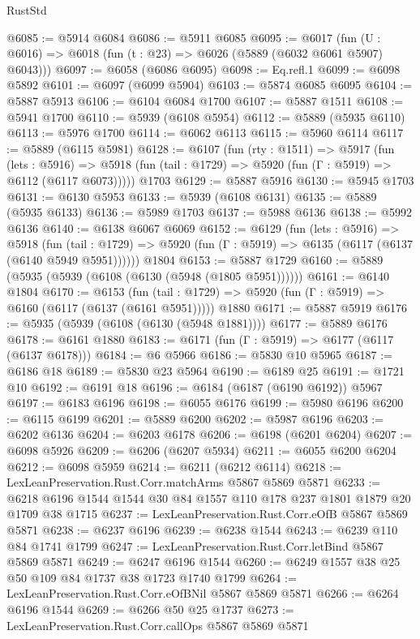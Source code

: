 \begin{lexlean}{RustStd}
\begin{coremodule}
@6085 := @5914 @6084
@6086 := @5911 @6085
@6095 := @6017 (fun (U : @6016) => @6018 (fun (t : @23) => @6026 (@5889 (@6032 @6061 @5907) @6043)))
@6097 := @6058 (@6086 @6095)
@6098 := Eq.refl.{1}
@6099 := @6098 @5892
@6101 := @6097 (@6099 @5904)
@6103 := @5874 @6085 @6095
@6104 := @5887 @5913
@6106 := @6104 @6084 @1700
@6107 := @5887 @1511
@6108 := @5941 @1700
@6110 := @5939 (@6108 @5954)
@6112 := @5889 (@5935 @6110)
@6113 := @5976 @1700
@6114 := @6062 @6113
@6115 := @5960 @6114
@6117 := @5889 (@6115 @5981)
@6128 := @6107
    (fun (rty : @1511) =>
    @5917
      (fun (lets : @5916) =>
      @5918 (fun (tail : @1729) => @5920 (fun (Γ : @5919) => @6112 (@6117 @6073)))))
    @1703
@6129 := @5887 @5916
@6130 := @5945 @1703
@6131 := @6130 @5953
@6133 := @5939 (@6108 @6131)
@6135 := @5889 (@5935 @6133)
@6136 := @5989 @1703
@6137 := @5988 @6136
@6138 := @5992 @6136
@6140 := @6138 @6067 @6069
@6152 := @6129
    (fun (lets : @5916) =>
    @5918
      (fun (tail : @1729) => @5920 (fun (Γ : @5919) => @6135 (@6117 (@6137 (@6140 @5949 @5951))))))
    @1804
@6153 := @5887 @1729
@6160 := @5889 (@5935 (@5939 (@6108 (@6130 (@5948 (@1805 @5951))))))
@6161 := @6140 @1804
@6170 := @6153
    (fun (tail : @1729) => @5920 (fun (Γ : @5919) => @6160 (@6117 (@6137 (@6161 @5951)))))
    @1880
@6171 := @5887 @5919
@6176 := @5935 (@5939 (@6108 (@6130 (@5948 @1881))))
@6177 := @5889 @6176
@6178 := @6161 @1880
@6183 := @6171 (fun (Γ : @5919) => @6177 (@6117 (@6137 @6178)))
@6184 := @6 @5966
@6186 := @5830 @10 @5965
@6187 := @6186 @18
@6189 := @5830 @23 @5964
@6190 := @6189 @25
@6191 := @1721 @10
@6192 := @6191 @18
@6196 := @6184 (@6187 (@6190 @6192)) @5967
@6197 := @6183 @6196
@6198 := @6055 @6176
@6199 := @5980 @6196
@6200 := @6115 @6199
@6201 := @5889 @6200
@6202 := @5987 @6196
@6203 := @6202 @6136
@6204 := @6203 @6178
@6206 := @6198 (@6201 @6204)
@6207 := @6098 @5926
@6209 := @6206 (@6207 @5934)
@6211 := @6055 @6200 @6204
@6212 := @6098 @5959
@6214 := @6211 (@6212 @6114)
@6218 := LexLeanPreservation.Rust.Corr.matchArms @5867 @5869 @5871
@6233 := @6218 @6196 @1544 @1544 @30 @84 @1557 @110 @178 @237 @1801 @1879 @20 @1709 @38 @1715
@6237 := LexLeanPreservation.Rust.Corr.eOfB @5867 @5869 @5871
@6238 := @6237 @6196
@6239 := @6238 @1544
@6243 := @6239 @110 @84 @1741 @1799
@6247 := LexLeanPreservation.Rust.Corr.letBind @5867 @5869 @5871
@6249 := @6247 @6196 @1544
@6260 := @6249 @1557 @38 @25 @50 @109 @84 @1737 @38 @1723 @1740 @1799
@6264 := LexLeanPreservation.Rust.Corr.eOfBNil @5867 @5869 @5871
@6266 := @6264 @6196 @1544
@6269 := @6266 @50 @25 @1737
@6273 := LexLeanPreservation.Rust.Corr.callOps @5867 @5869 @5871

\end{coremodule}
\end{lexlean}
